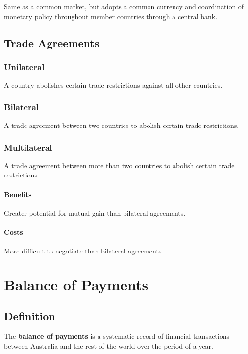 \documentclass[a4paper,11pt]{report}
\begin{document}
Same as a common market, but adopts a common currency and coordination of
monetary policy throughout member countries through a central bank.


\section{Trade Agreements}

\subsection{Unilateral}

A country abolishes certain trade restrictions against all other countries.

\subsection{Bilateral}

A trade agreement between two countries to abolish certain trade restrictions.

\subsection{Multilateral}

A trade agreement between more than two countries to abolish certain trade
restrictions.

\subsubsection{Benefits}

Greater potential for mutual gain than bilateral agreements.

\subsubsection{Costs}

More difficult to negotiate than bilateral agreements.




\chapter{Balance of Payments}

\section{Definition}

The \textbf{balance of payments} is a systematic record of financial
transactions between Australia and the rest of the world over the period of a
year.
\end{document}
